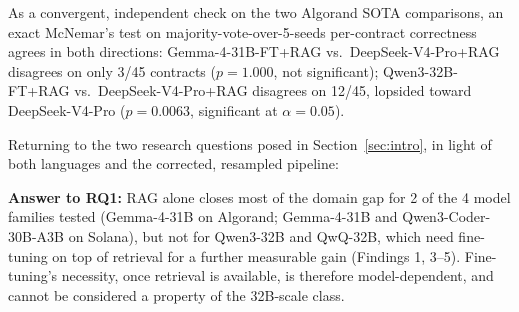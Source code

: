 \documentclass[lettersize,journal]{IEEEtran}
\newcommand{\rqanswer}[2]{\par\noindent\colorbox{gray!12}{\parbox{0.965\linewidth}{\vspace{0.15cm}\textbf{Answer
to #1:} #2\vspace{0.15cm}}}\par\vspace{0.25cm}}
\begin{document}
As a convergent, independent check on the two Algorand SOTA comparisons, an exact McNemar's test on
majority-vote-over-5-seeds per-contract correctness agrees in both directions: Gemma-4-31B-FT+RAG
vs.\ DeepSeek-V4-Pro+RAG disagrees on only 3/45 contracts ($p=1.000$, not significant); Qwen3-32B-FT+RAG
vs.\ DeepSeek-V4-Pro+RAG disagrees on 12/45, lopsided toward DeepSeek-V4-Pro ($p=0.0063$, significant
at $\alpha=0.05$).




Returning to the two research questions posed in Section~\ref{sec:intro}, in light of both languages
and the corrected, resampled pipeline:

\rqanswer{RQ1}{RAG alone closes most of the domain gap for 2 of the 4 model families tested
(Gemma-4-31B on Algorand; Gemma-4-31B and Qwen3-Coder-30B-A3B on Solana), but not for Qwen3-32B and
QwQ-32B, which need fine-tuning on top of retrieval for a further measurable gain (Findings 1, 3--5).
Fine-tuning's necessity, once retrieval is available, is therefore model-dependent, and cannot be considered a
property of the 32B-scale class.}
\end{document}
